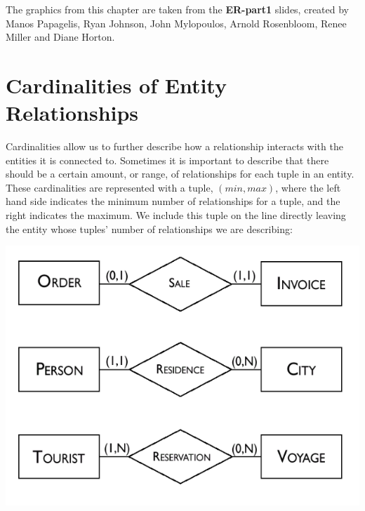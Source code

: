 \documentclass{report}
\begin{document}
\begin{note}
    The graphics from this chapter are taken from the \textbf{ER-part1} slides, created by Manos Papagelis, Ryan Johnson, John Mylopoulos, 
    Arnold Rosenbloom, Renee Miller and Diane Horton.
\end{note}


\section{Cardinalities of Entity Relationships}

Cardinalities allow us to further describe how a relationship interacts with the entities it is connected to. Sometimes it is important to describe that there should be a certain amount, or range, of relationships for each tuple in an entity. These cardinalities are represented with a tuple, $(min, max)$, where the left hand side indicates the minimum number of relationships for a tuple, and the right indicates the maximum. We include this tuple on the line directly leaving the entity whose tuples' number of relationships we are describing:

\begin{center}
    \includegraphics[scale = .75]{2022-12-13-20-30-47.png}
\end{center}
\end{document}
